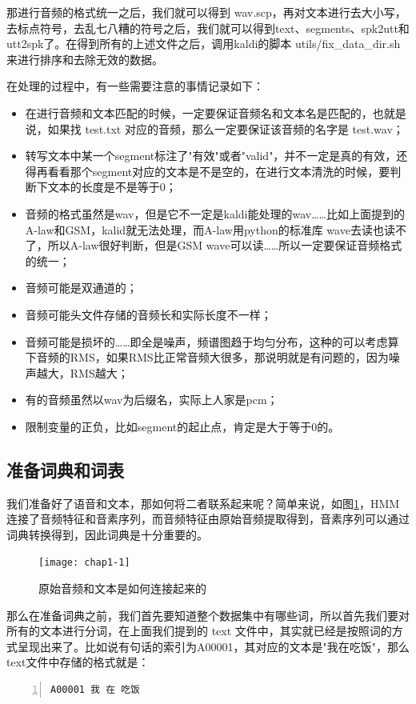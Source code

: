 那进行音频的格式统一之后，我们就可以得到 wav.scp，再对文本进行去大小写，去标点符号，去乱七八糟的符号之后，我们就可以得到text、segments、spk2utt和utt2spk了。在得到所有的上述文件之后，调用kaldi的脚本 utils/fix\_data\_dir.sh 来进行排序和去除无效的数据。

在处理的过程中，有一些需要注意的事情记录如下：
\begin{itemize}
	\item 在进行音频和文本匹配的时候，一定要保证音频名和文本名是匹配的，也就是说，如果找 test.txt 对应的音频，那么一定要保证该音频的名字是 test.wav；
	\item 转写文本中某一个segment标注了"有效"或者"valid"，并不一定是真的有效，还得再看看那个segment对应的文本是不是空的，在进行文本清洗的时候，要判断下文本的长度是不是等于0；
	\item 音频的格式虽然是wav，但是它不一定是kaldi能处理的wav……比如上面提到的A-law和GSM，kalid就无法处理，而A-law用python的标准库 wave去读也读不了，所以A-law很好判断，但是GSM wave可以读……所以一定要保证音频格式的统一；
	\item 音频可能是双通道的；
	\item 音频可能头文件存储的音频长和实际长度不一样；
	\item 音频可能是损坏的……即全是噪声，频谱图趋于均匀分布，这种的可以考虑算下音频的RMS，如果RMS比正常音频大很多，那说明就是有问题的，因为噪声越大，RMS越大；
	\item 有的音频虽然以wav为后缀名，实际上人家是pcm；
	\item 限制变量的正负，比如segment的起止点，肯定是大于等于0的。
\end{itemize}

\subsection{准备词典和词表}
我们准备好了语音和文本，那如何将二者联系起来呢？简单来说，如图\ref{fig:basic-theory}，HMM连接了音频特征和音素序列，而音频特征由原始音频提取得到，音素序列可以通过词典转换得到，因此词典是十分重要的。
\begin{figure}[h]
  \centering
  \texttt{[image: chap1-1]}
  \caption{原始音频和文本是如何连接起来的 \label{fig:basic-theory}}
\end{figure}

那么在准备词典之前，我们首先要知道整个数据集中有哪些词，所以首先我们要对所有的文本进行分词，在上面我们提到的 text 文件中，其实就已经是按照词的方式呈现出来了。比如说有句话的索引为A00001，其对应的文本是"我在吃饭"，那么text文件中存储的格式就是：
\begin{lstlisting}[language=shell, numbers=left, 
         numberstyle=\tiny,keywordstyle=\color{blue!70},
         commentstyle=\color{red!50!green!50!blue!50},frame=shadowbox,
         rulesepcolor=\color{red!20!green!20!blue!20},basicstyle=\ttfamily]
A00001 我 在 吃饭
\end{lstlisting}

